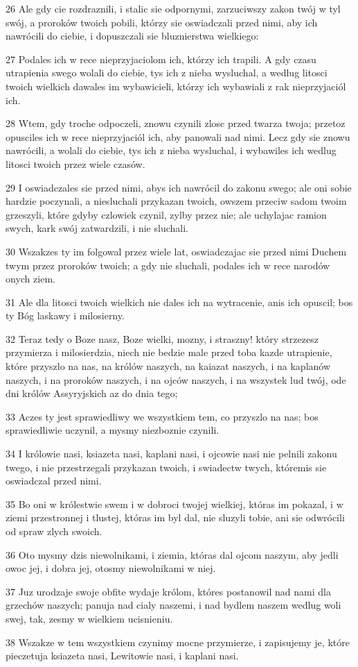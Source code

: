 \par 26 Ale gdy cie rozdraznili, i stalic sie odpornymi, zarzuciwszy zakon twój w tyl swój, a proroków twoich pobili, którzy sie oswiadczali przed nimi, aby ich nawrócili do ciebie, i dopuszczali sie bluznierstwa wielkiego:
\par 27 Podales ich w rece nieprzyjaciolom ich, którzy ich trapili. A gdy czasu utrapienia swego wolali do ciebie, tys ich z nieba wysluchal, a wedlug litosci twoich wielkich dawales im wybawicieli, którzy ich wybawiali z rak nieprzyjaciól ich.
\par 28 Wtem, gdy troche odpoczeli, znowu czynili zlosc przed twarza twoja; przetoz opusciles ich w rece nieprzyjaciól ich, aby panowali nad nimi. Lecz gdy sie znowu nawrócili, a wolali do ciebie, tys ich z nieba wysluchal, i wybawiles ich wedlug litosci twoich przez wiele czasów.
\par 29 I oswiadczales sie przed nimi, abys ich nawrócil do zakonu swego; ale oni sobie hardzie poczynali, a niesluchali przykazan twoich, owszem przeciw sadom twoim grzeszyli, które gdyby czlowiek czynil, zylby przez nie; ale uchylajac ramion swych, kark swój zatwardzili, i nie sluchali.
\par 30 Wszakzes ty im folgowal przez wiele lat, oswiadczajac sie przed nimi Duchem twym przez proroków twoich; a gdy nie sluchali, podales ich w rece narodów onych ziem.
\par 31 Ale dla litosci twoich wielkich nie dales ich na wytracenie, anis ich opuscil; bos ty Bóg laskawy i milosierny.
\par 32 Teraz tedy o Boze nasz, Boze wielki, mozny, i straszny! który strzezesz przymierza i milosierdzia, niech nie bedzie male przed toba kazde utrapienie, które przyszlo na nas, na królów naszych, na kaiazat naszych, i na kaplanów naszych, i na proroków naszych, i na ojców naszych, i na wszystek lud twój, ode dni królów Assyryjskich az do dnia tego;
\par 33 Aczes ty jest sprawiedliwy we wszystkiem tem, co przyszlo na nas; bos sprawiedliwie uczynil, a mysmy niezboznie czynili.
\par 34 I królowie nasi, ksiazeta nasi, kaplani nasi, i ojcowie nasi nie pelnili zakonu twego, i nie przestrzegali przykazan twoich, i swiadectw twych, któremis sie oswiadczal przed nimi.
\par 35 Bo oni w królestwie swem i w dobroci twojej wielkiej, któras im pokazal, i w ziemi przestronnej i tlustej, któras im byl dal, nie sluzyli tobie, ani sie odwrócili od spraw zlych swoich.
\par 36 Oto mysmy dzis niewolnikami, i ziemia, któras dal ojcom naszym, aby jedli owoc jej, i dobra jej, otosmy niewolnikami w niej.
\par 37 Juz urodzaje swoje obfite wydaje królom, któres postanowil nad nami dla grzechów naszych; panuja nad cialy naszemi, i nad bydlem naszem wedlug woli swej, tak, zesmy w wielkiem ucisnieniu.
\par 38 Wszakze w tem wszystkiem czynimy mocne przymierze, i zapisujemy je, które pieczetuja ksiazeta nasi, Lewitowie nasi, i kaplani nasi.

